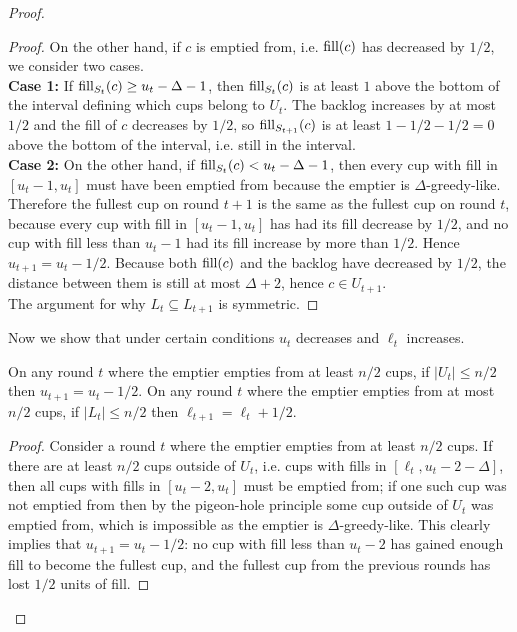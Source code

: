 \begin{proof}
\begin{proof}
    On the other hand, if $c$ is emptied from, i.e. $\operatorname{\textnormal{fill}}(c)$ has decreased by
    $1/2$, we consider two cases.\\
    \textbf{Case 1:} If $\operatorname{\textnormal{fill}}_{S_t}(c) \ge u_t-\Delta -1$, then
    $\operatorname{\textnormal{fill}}_{S_t}(c)$ is at least $1$ above the bottom of the
    interval defining which cups belong to $U_t$. The backlog
    increases by at most $1/2$ and the fill of $c$ decreases by $1/2$, so
    $\operatorname{\textnormal{fill}}_{S_{t+1}}(c)$ is at least $1-1/2-1/2 = 0$ above the bottom of the
    interval, i.e. still in the interval. \\
    \textbf{Case 2:} On the other hand, if $\operatorname{\textnormal{fill}}_{S_t}(c) <
    u_t-\Delta-1$, then every cup with fill in $[u_t-1, u_t]$
    must have been emptied from because the emptier is
    $\Delta$-greedy-like. Therefore the fullest cup
    on round $t+1$ is the same as the fullest cup on round $t$,
    because every cup with fill in $[u_t-1, u_t]$
    has had its fill decrease by $1/2$, and no cup with fill less than
    $u_t-1$ had its fill increase by more than $1/2$. Hence $u_{t+1}
    = u_t -1/2$. Because both $\operatorname{\textnormal{fill}}(c)$ and the backlog
    have decreased by $1/2$, the distance between them is
    still at most $\Delta+2$, hence $c\in U_{t+1}$.\\
    The argument for why $L_t \subseteq L_{t+1}$ is symmetric.
  \end{proof}

  Now we show that under certain conditions $u_t$ decreases and
  $\ell_t$ increases.
  \begin{clm}
    \label{clm:howDoLandUchange}
    On any round $t$ where the emptier empties from at least
    $n/2$ cups, if $|U_t| \le n/2$ then $u_{t+1} = u_t - 1/2$.
    On any round $t$ where the emptier empties from at most $n/2$
    cups, if $|L_t| \le n/2$ then $\ell_{t+1} = \ell_t + 1/2$.
  \end{clm}
  \begin{proof}
    Consider a round $t$ where the emptier empties from at least
    $n/2$ cups. If there are at least $n/2$ cups outside of
    $U_t$, i.e. cups with fills in $[\ell_t, u_t-2-\Delta]$, then
    all cups with fills in $[u_t - 2, u_t]$ must be emptied from;
    if one such cup was not emptied from then by the pigeon-hole
    principle some cup outside of $U_t$ was emptied from, which
    is impossible as the emptier is $\Delta$-greedy-like. This
    clearly implies that $u_{t+1} = u_t - 1/2$: no cup with fill
    less than $u_t-2$ has gained enough fill to become the
    fullest cup, and the fullest cup from the previous rounds has
    lost $1/2$ units of fill.


\end{proof}
\end{proof}
